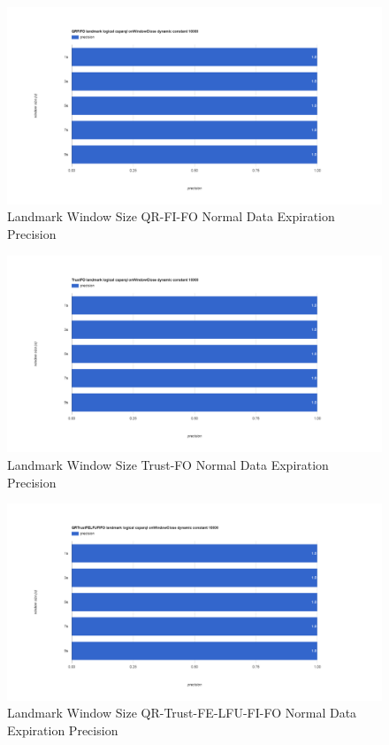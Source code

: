 \begin{figure}[!htbp]
	\centering
    \includegraphics[width=\textwidth]{img/app3-land-ws-qrfifo-normal-p.png}
    \caption{Landmark Window Size QR-FI-FO Normal Data Expiration Precision}
\end{figure}
\begin{figure}[!htbp]
	\centering
    \includegraphics[width=\textwidth]{img/app3-land-ws-trustfo-normal-p.png}
    \caption{Landmark Window Size Trust-FO Normal Data Expiration Precision}
\end{figure}
\begin{figure}[!htbp]
	\centering
    \includegraphics[width=\textwidth]{img/app3-land-ws-qrtrustfelfufifo-normal-p.png}
    \caption{Landmark Window Size QR-Trust-FE-LFU-FI-FO Normal Data Expiration Precision}
\end{figure}

